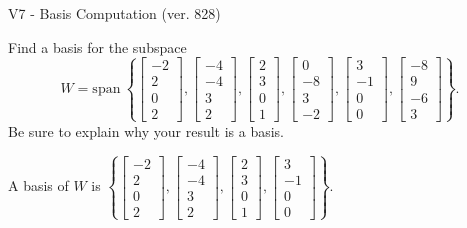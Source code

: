 \begin{exercise}
  \begin{exerciseTitle}V7 - Basis Computation (ver. 828)\end{exerciseTitle}
  \begin{exerciseStatement}
    Find a basis for the subspace 
\[W=\mathrm{span}\ \left\{\left[\begin{array}{r}
-2 \\
2 \\
0 \\
2
\end{array}\right] , \left[\begin{array}{r}
-4 \\
-4 \\
3 \\
2
\end{array}\right] , \left[\begin{array}{r}
2 \\
3 \\
0 \\
1
\end{array}\right] , \left[\begin{array}{r}
0 \\
-8 \\
3 \\
-2
\end{array}\right] , \left[\begin{array}{r}
3 \\
-1 \\
0 \\
0
\end{array}\right] , \left[\begin{array}{r}
-8 \\
9 \\
-6 \\
3
\end{array}\right]\right\}.\]
 Be sure to explain why your result is a basis.


  \end{exerciseStatement}
  \begin{exerciseAnswer}
   A basis of \(W\) is  \(\left\{\left[\begin{array}{r}
-2 \\
2 \\
0 \\
2
\end{array}\right] , \left[\begin{array}{r}
-4 \\
-4 \\
3 \\
2
\end{array}\right] , \left[\begin{array}{r}
2 \\
3 \\
0 \\
1
\end{array}\right] , \left[\begin{array}{r}
3 \\
-1 \\
0 \\
0
\end{array}\right]\right\}\).
  


  \end{exerciseAnswer}
\end{exercise}
